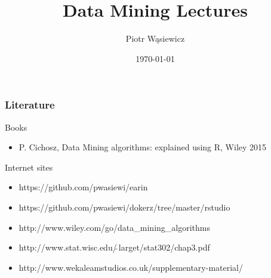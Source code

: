 \documentclass{beamer}
\title[EARIN]{Data Mining Lectures}
\author{Piotr Wąsiewicz}
\institute[ICS PW]
{
Institute of Computer Science\\
\medskip
{\emph{pwasiewi@elka.pw.edu.pl}}
}
\date{\today}
\begin{document}

\lstset{frameround=trbl}
\lstset{commentstyle=\textit, stringstyle=\upshape,showspaces=false}

\begin{frame}
\titlepage
\end{frame}

\begin{frame}
\frametitle{Literature}
\begin{block}{Books}
\begin{itemize}
\item P. Cichosz, Data Mining algorithms: explained using R, Wiley 2015
\end{itemize}
\end{block}
\begin{block}{Internet sites}
\begin{itemize}
\item https://github.com/pwasiewi/earin
\item https://github.com/pwasiewi/dokerz/tree/master/rstudio
\item http://www.wiley.com/go/data\_mining\_algorithms
\item http://www.stat.wisc.edu/$\tilde{\ }$larget/stat302/chap3.pdf
\item http://www.wekaleamstudios.co.uk/supplementary-material/
\end{itemize}
\end{block}
\end{frame}
\end{document}
